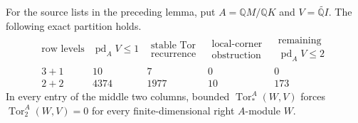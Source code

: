 \begin{proposition}
\label{C:four-row-six-outside-row-reduction}
For the source lists in the preceding lemma, put
$A=\mathbb QM/\mathbb QK$ and $V=\widetilde{\mathbb QI}$.
The following exact partition holds.
\[
\begin{array}{c|r|r|r|r}
\text{row levels}&\operatorname{pd}_A V\leq1&
 \substack{\text{stable Tor}\\\text{recurrence}}&\substack{\text{local-corner}\\\text{obstruction}}&
 \substack{\text{remaining}\\\operatorname{pd}_A V\leq2}\\\hline
3+1&10&7&0&0\\
2+2&4374&1977&10&173
\end{array}
\]
In every entry of the middle two columns, bounded
$\operatorname{Tor}_*^A(W,V)$ forces
$\operatorname{Tor}_2^A(W,V)=0$ for every finite-dimensional right
$A$-module $W$.
\end{proposition}

